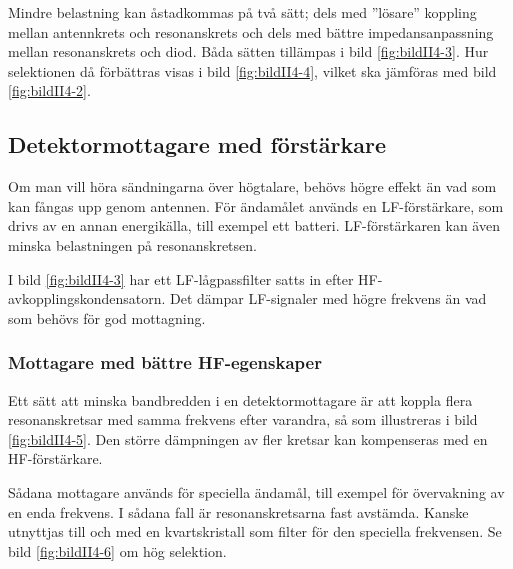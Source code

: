 Mindre belastning kan åstadkommas på två sätt; dels med ''lösare''
koppling mellan antennkrets och resonanskrets och dels med bättre
impedansanpassning mellan resonanskrets och diod. Båda sätten
tillämpas i bild \ref{fig:bildII4-3}. Hur selektionen då förbättras visas i
bild \ref{fig:bildII4-4}, vilket ska jämföras med bild \ref{fig:bildII4-2}.



\subsection{Detektormottagare med förstärkare}

Om man vill höra sändningarna över högtalare, behövs högre effekt än
vad som kan fångas upp genom antennen.
För ändamålet används en LF-förstärkare, som drivs av en annan energikälla,
till exempel ett batteri.
LF-förstärkaren kan även minska belastningen på resonanskretsen.

I bild \ref{fig:bildII4-3} har ett LF-lågpassfilter satts in efter
HF-avkopplingskondensatorn.
Det dämpar LF-signaler med högre frekvens än vad som behövs för god mottagning.

\subsubsection{Mottagare med bättre HF-egenskaper}
\label{mottagare_bättre_hf}

Ett sätt att minska bandbredden i en detektormottagare är att koppla
flera resonanskretsar med samma frekvens efter varandra, så som illustreras
i bild \ref{fig:bildII4-5}.
Den större dämpningen av fler kretsar kan kompenseras med en HF-förstärkare.

Sådana mottagare används för speciella ändamål, till exempel för övervakning
av en enda frekvens.
I sådana fall är resonanskretsarna fast avstämda.
Kanske utnyttjas till och med en kvartskristall som filter för den speciella
frekvensen.
Se bild \ref{fig:bildII4-6} om hög selektion.



